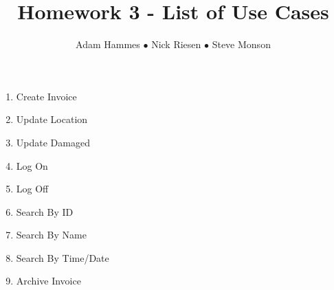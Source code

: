 \documentclass{article}
\title{Homework 3 - List of Use Cases}
\author{Adam Hammes $\bullet$ Nick Riesen $\bullet$ Steve Monson}
\begin{document}
\maketitle

\begin{enumerate}
    \item Create Invoice
    \item Update Location
    \item Update Damaged
    \item Log On
    \item Log Off
    \item Search By ID
    \item Search By Name
    \item Search By Time/Date
    \item Archive Invoice
\end{enumerate}
\end{document}
